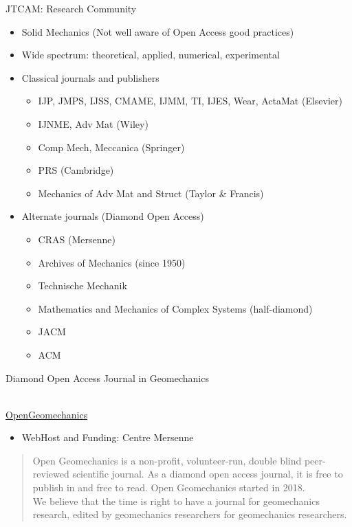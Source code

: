 \documentclass[10pt,compress,serif,aspectratio=169]{beamer}
\newcommand{\fig}[2]{\centering{\texttt{[image: \#2]}}}
\begin{document}
\begin{frame}[t]{JTCAM: Research Community}
\begin{itemize}
 \item Solid Mechanics (Not well aware of Open Access good practices)
 \item Wide spectrum: theoretical, applied, numerical, experimental
 \item Classical journals and publishers
 \begin{itemize}
 \item IJP, JMPS, IJSS, CMAME, IJMM, TI, IJES, Wear, ActaMat (Elsevier)
 \item IJNME, Adv Mat (Wiley)
 \item Comp Mech, Meccanica (Springer)
 \item PRS (Cambridge)
 \item Mechanics of Adv Mat and Struct (Taylor \& Francis)
 \end{itemize}
 \item Alternate journals (Diamond Open Access)
  \begin{itemize}
 \item CRAS (Mersenne)
 \item Archives of Mechanics (since 1950)
 \item Technische Mechanik
 \item Mathematics and Mechanics of Complex Systems (half-diamond)
 \item JACM
 \item ACM
 \end{itemize}
\end{itemize}

\end{frame}


\begin{frame}[t]{Diamond Open Access Journal in Geomechanics}

  \fig{.4}{ogeo}\\
  {\Large \href{https://opengeomechanics.centre-mersenne.org/}{OpenGeomechanics}}

  \vfill
  \begin{itemize}
  \item WebHost and Funding: Centre Mersenne
  \end{itemize}

  \begin{quote}
    Open Geomechanics is a non-profit, volunteer-run, double blind
 peer-reviewed scientific journal. As a diamond open access journal,
 it is free to publish in and free to read. Open Geomechanics started
 in 2018.\\

 We believe that the time is right to have a journal for geomechanics
 research, edited by geomechanics researchers for geomechanics
 researchers.
\end{quote}
\end{frame}
\end{document}

